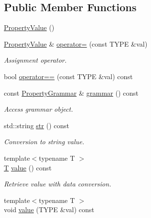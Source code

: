 \subsection*{Public Member Functions}
\begin{DoxyCompactItemize}
\item 
\hyperlink{class_d_d4hep_1_1_property_value_a6dcb85ebdb83313c9593c86431b3316e}{PropertyValue} ()
\item 
\hyperlink{class_d_d4hep_1_1_property_value}{PropertyValue} \& \hyperlink{class_d_d4hep_1_1_property_value_acb9f4997dbe446e56717ba1d58929303}{operator=} (const TYPE \&val)
\begin{DoxyCompactList}\small\item\em Assignment operator. \item\end{DoxyCompactList}\item 
bool \hyperlink{class_d_d4hep_1_1_property_value_a57aecd66101f8de649d60bad0ac9791e}{operator==} (const TYPE \&val) const 
\item 
const \hyperlink{class_d_d4hep_1_1_property_grammar}{PropertyGrammar} \& \hyperlink{class_d_d4hep_1_1_property_value_a38e94952fe4125eb2cd93a3b10a202d6}{grammar} () const 
\begin{DoxyCompactList}\small\item\em Access grammar object. \item\end{DoxyCompactList}\item 
std::string \hyperlink{class_d_d4hep_1_1_property_value_aee9a0afd8a49155741da905fdadbbc91}{str} () const 
\begin{DoxyCompactList}\small\item\em Conversion to string value. \item\end{DoxyCompactList}\item 
{\footnotesize template$<$typename T $>$ }\\\hyperlink{class_t}{T} \hyperlink{class_d_d4hep_1_1_property_value_a4a0c43ad417f9dd13c618625bac0fb9b}{value} () const 
\begin{DoxyCompactList}\small\item\em Retrieve value with data conversion. \item\end{DoxyCompactList}\item 
{\footnotesize template$<$typename T $>$ }\\void \hyperlink{class_d_d4hep_1_1_property_value_a6d455c08f342459a3f372279c4b9ce09}{value} (TYPE \&val) const 

\end{DoxyCompactItemize}
